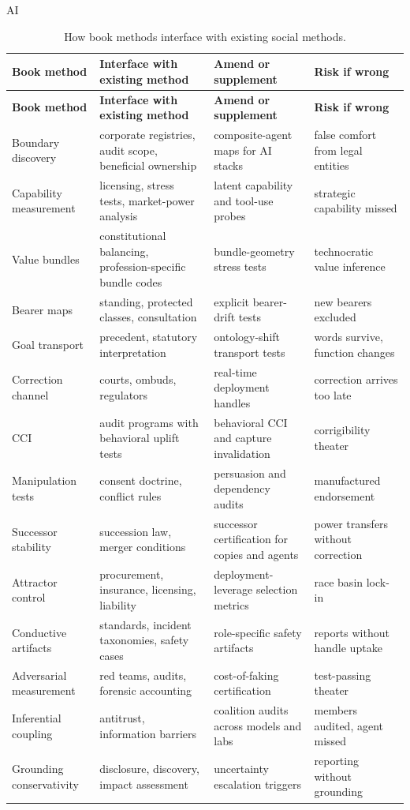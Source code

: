 \begin{refsection}
\begin{authbar}{AI}
\renewcommand{\arraystretch}{1.15}
\end{authbar}
\begin{longtable}{@{}p{}p{}p{}p{}@{}}
\caption{How book methods interface with existing social methods.}\label{tab:institutional-interface}\\
\toprule
\textbf{Book method} & \textbf{Interface with existing method} & \textbf{Amend or supplement} & \textbf{Risk if wrong} \\
\midrule
\endfirsthead
\toprule
\textbf{Book method} & \textbf{Interface with existing method} & \textbf{Amend or supplement} & \textbf{Risk if wrong} \\
\midrule
\endhead
\bottomrule
\endfoot
Boundary discovery & corporate registries, audit scope, beneficial ownership & composite-agent maps for AI stacks & false comfort from legal entities \\
Capability measurement & licensing, stress tests, market-power analysis & latent capability and tool-use probes & strategic capability missed \\
Value bundles & constitutional balancing, profession-specific bundle codes & bundle-geometry stress tests & technocratic value inference \\
Bearer maps & standing, protected classes, consultation & explicit bearer-drift tests & new bearers excluded \\
Goal transport & precedent, statutory interpretation & ontology-shift transport tests & words survive, function changes \\
Correction channel & courts, ombuds, regulators & real-time deployment handles & correction arrives too late \\
CCI & audit programs with behavioral uplift tests & behavioral CCI and capture invalidation & corrigibility theater \\
Manipulation tests & consent doctrine, conflict rules & persuasion and dependency audits & manufactured endorsement \\
Successor stability & succession law, merger conditions & successor certification for copies and agents & power transfers without correction \\
Attractor control & procurement, insurance, licensing, liability & deployment-leverage selection metrics & race basin lock-in \\
Conductive artifacts & standards, incident taxonomies, safety cases & role-specific safety artifacts & reports without handle uptake \\
Adversarial measurement & red teams, audits, forensic accounting & cost-of-faking certification & test-passing theater \\
Inferential coupling & antitrust, information barriers & coalition audits across models and labs & members audited, agent missed \\
Grounding conservativity & disclosure, discovery, impact assessment & uncertainty escalation triggers & reporting without grounding \\
\end{longtable}
\renewcommand{\arraystretch}{1.0}


\end{refsection}
